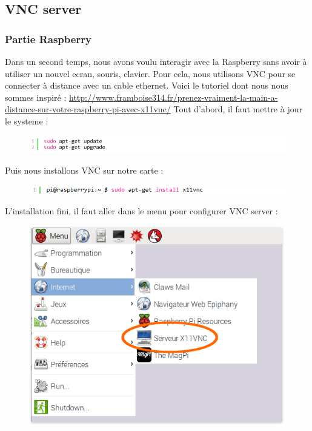 \documentclass[a4paper,11pt]{report}
\begin{document}
		\subsection{VNC server}
			\subsubsection{Partie Raspberry}
			Dans un second temps, nous avons voulu interagir avec la Raspberry sans avoir à utiliser un nouvel ecran, 			souris, clavier. Pour cela, nous utilisons VNC pour se connecter à distance avec un cable ethernet. \newline
			Voici le tutoriel dont nous nous sommes inspiré :\newline
			\url{http://www.framboise314.fr/prenez-vraiment-la-main-a-distance-sur-votre-raspberry-pi-avec-x11vnc/}
			\newline Tout d'abord, il faut mettre à jour le systeme :
			\begin{figure}[!h]
				\begin{center}
					\includegraphics{Illustrations/1.png}
				\end{center}
			\end{figure}
			\newline Puis nous installons VNC sur notre carte :
			\begin{figure}[!h]
				\begin{center}
					\includegraphics{Illustrations/2.png}
				\end{center}
			\end{figure}
			\newpage L'installation fini, il faut aller dans le menu pour configurer VNC server :
			\begin{figure}[!h]
				\begin{center}
					\includegraphics[scale=0.5]{Illustrations/3.png}
				\end{center}
			\end{figure}
\end{document}
